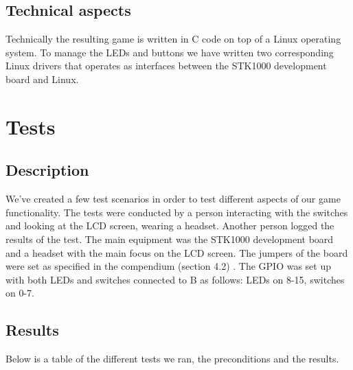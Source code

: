 \documentclass[a4paper,11pt]{article}
\begin{document}
\subsection{Technical aspects}Technically the resulting game is written in C code on top of a Linux operating system. To manage the LEDs and buttons we have written two corresponding Linux drivers that operates as interfaces between the STK1000 development board and Linux. 

\section{Tests}
\subsection{Description}

We've created a few test scenarios in order to test different aspects of our game functionality. The tests were conducted by a person interacting with the switches and looking at the LCD screen, wearing a headset. Another person logged the results of the test. The main equipment was the STK1000 development board and a headset with the main focus on the LCD screen. The jumpers of the board were set as specified in the compendium (section 4.2) \cite{komp}. The GPIO was set up with both LEDs and switches connected to B as follows: LEDs on 8-15, switches on 0-7. 

\subsection{Results}
Below is a table of the different tests we ran, the preconditions and the results. 
\end{document}
